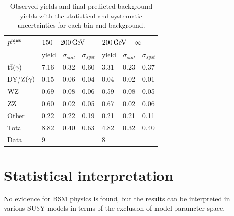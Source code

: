 \begin{table}[bpt]
 \centering
 \caption{Observed yields and final predicted background yields with the statistical and systematic uncertainties for each bin and background.}
 \normalsize
 \label{tab:results}
 \begin{tabular}{lllllll}
  $p_{\mathrm{T}}^\text{miss}$      & \multicolumn{3}{l}{$150-200\,\text{Ge\hspace{-.08em}V}$} & \multicolumn{3}{l}{$200\,\text{Ge\hspace{-.08em}V}-\infty$}                                                               \\\hline
                 & yield                             & $\sigma_{stat}$                      & $\sigma_{syst}$ & yield & $\sigma_{stat}$ & $\sigma_{syst}$ \\\hline
  ${\mathrm{t}\overline{\mathrm{t}}}(\gamma)$ & 7.16                              & 0.32                                 & 0.60            & 3.31  & 0.23            & 0.37            \\
  DY/$\mathrm{Z}(\gamma)$ & 0.15                              & 0.06                                 & 0.04            & 0.04  & 0.02            & 0.01            \\
  $\mathrm{W}\mathrm{Z}$       & 0.69                              & 0.08                                 & 0.06            & 0.59  & 0.08            & 0.05            \\
  $\mathrm{Z}\mathrm{Z}$       & 0.60                              & 0.02                                 & 0.05            & 0.67  & 0.02            & 0.06            \\
  Other          & 0.22                              & 0.22                                 & 0.19            & 0.21  & 0.21            & 0.11            \\\hline
  Total          & 8.82                              & 0.40                                 & 0.63            & 4.82  & 0.32            & 0.40            \\\hline
  Data           & 9                                 &                                      &                 & 8     &                 &                 \\\hline
 \end{tabular}
\end{table}


\section{Statistical interpretation}
No evidence for BSM physics is found, but the results can be interpreted in various SUSY models in terms of the exclusion of model parameter space.
